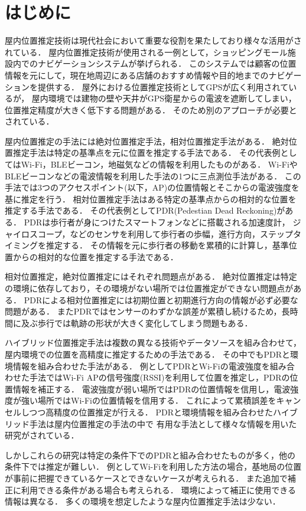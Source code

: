 
\section{はじめに}
屋内位置推定技術は現代社会において重要な役割を果たしており様々な活用がされている．
屋内位置推定技術が使用される一例として，ショッピングモール施設内でのナビゲーションシステムが挙げられる\cite{burasapo}．
このシステムでは顧客の位置情報を元にして，現在地周辺にある店舗のおすすめ情報や目的地までのナビゲーションを提供する．
屋外における位置推定技術としてGPSが広く利用されているが，
屋内環境では建物の壁や天井がGPS衛星からの電波を遮断してしまい，
位置推定精度が大きく低下する問題がある．
そのため別のアプローチが必要とされている．

屋内位置推定の手法には絶対位置推定手法，相対位置推定手法がある．
絶対位置推定手法は特定の基準点を元に位置を推定する手法である．
その代表例としてはWi-Fi，BLEビーコン，地磁気などの情報を利用したものがある．
Wi-FiやBLEビーコンなどの電波情報を利用した手法の1つに三点測位手法がある．
この手法では3つのアクセスポイント(以下，AP)の位置情報とそこからの電波強度を基に推定を行う．
相対位置推定手法はある特定の基準点からの相対的な位置を推定する手法である．
その代表例としてPDR(Pedestian Dead Reckoning)がある．
PDRは歩行者が身につけたスマートフォンなどに搭載される加速度計，
ジャイロスコープ，などのセンサを利用して歩行者の歩幅，進行方向，ステップタイミングを推定する．
その情報を元に歩行者の移動を累積的に計算し，基準位置からの相対的な位置を推定する手法である．

相対位置推定，絶対位置推定にはそれぞれ問題点がある．
絶対位置推定は特定の環境に依存しており，その環境がない場所では位置推定ができない問題点がある．
PDRによる相対位置推定には初期位置と初期進行方向の情報が必ず必要な問題がある．
またPDRではセンサーのわずかな誤差が累積し続けるため，長時間に及ぶ歩行では軌跡の形状が大きく変化してしまう問題もある．

ハイブリッド位置推定手法は複数の異なる技術やデータソースを組み合わせて，
屋内環境での位置を高精度に推定するための手法である．
その中でもPDRと環境情報を組み合わせた手法がある．
例としてPDRとWi-Fiの電波強度を組み合わせた手法ではWi-Fi APの信号強度(RSSI)を利用して位置を推定し，PDRの位置情報を補正する．
電波強度が弱い場所ではPDRの位置情報を信用し，電波強度が強い場所ではWi-Fiの位置情報を信用する．
これによって累積誤差をキャンセルしつつ高精度の位置推定が行える．
PDRと環境情報を組み合わせたハイブリッド手法は屋内位置推定の手法の中で
有用な手法として様々な情報を用いた研究がされている．

しかしこれらの研究は特定の条件下でのPDRと組み合わせたものが多く，他の条件下では推定が難しい．
例としてWi-Fiを利用した方法の場合，基地局の位置が事前に把握できているケースとできないケースが考えられる．
また追加で補正に利用できる条件がある場合も考えられる．
環境によって補正に使用できる情報は異なる．
多くの環境を想定したような屋内位置推定手法は少ない．

